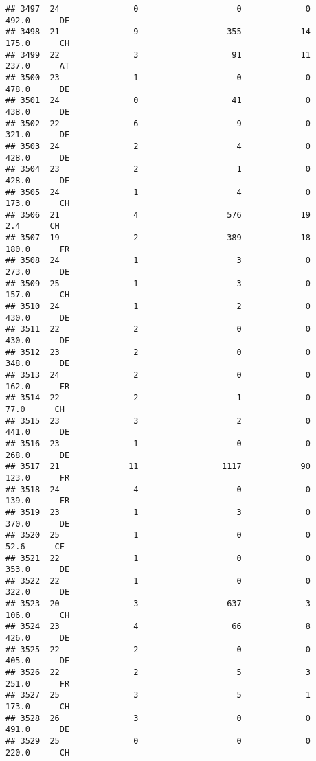 \documentclass[
]{article}
\begin{document}
\begin{verbatim}
## 3497  24               0                    0             0    492.0      DE
## 3498  21               9                  355            14    175.0      CH
## 3499  22               3                   91            11    237.0      AT
## 3500  23               1                    0             0    478.0      DE
## 3501  24               0                   41             0    438.0      DE
## 3502  22               6                    9             0    321.0      DE
## 3503  24               2                    4             0    428.0      DE
## 3504  23               2                    1             0    428.0      DE
## 3505  24               1                    4             0    173.0      CH
## 3506  21               4                  576            19      2.4      CH
## 3507  19               2                  389            18    180.0      FR
## 3508  24               1                    3             0    273.0      DE
## 3509  25               1                    3             0    157.0      CH
## 3510  24               1                    2             0    430.0      DE
## 3511  22               2                    0             0    430.0      DE
## 3512  23               2                    0             0    348.0      DE
## 3513  24               2                    0             0    162.0      FR
## 3514  22               2                    1             0     77.0      CH
## 3515  23               3                    2             0    441.0      DE
## 3516  23               1                    0             0    268.0      DE
## 3517  21              11                 1117            90    123.0      FR
## 3518  24               4                    0             0    139.0      FR
## 3519  23               1                    3             0    370.0      DE
## 3520  25               1                    0             0     52.6      CF
## 3521  22               1                    0             0    353.0      DE
## 3522  22               1                    0             0    322.0      DE
## 3523  20               3                  637             3    106.0      CH
## 3524  23               4                   66             8    426.0      DE
## 3525  22               2                    0             0    405.0      DE
## 3526  22               2                    5             3    251.0      FR
## 3527  25               3                    5             1    173.0      CH
## 3528  26               3                    0             0    491.0      DE
## 3529  25               0                    0             0    220.0      CH

\end{verbatim}
\end{document}
